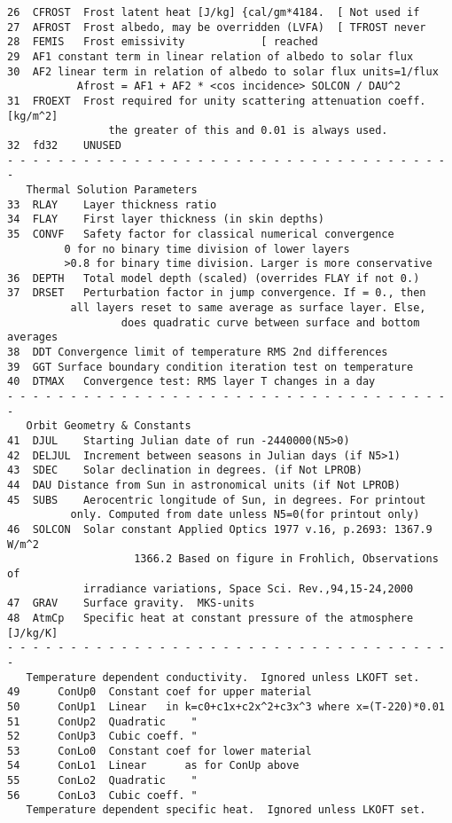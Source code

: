 \begin{verbatim}
26	CFROST	Frost latent heat [J/kg] {cal/gm*4184. 	[ Not used if
27	AFROST	Frost albedo, may be overridden (LVFA)	[ TFROST never
28	FEMIS	Frost emissivity  			[ reached
29	AF1	constant term in linear relation of albedo to solar flux
30	AF2	linear term in relation of albedo to solar flux units=1/flux
		   Afrost = AF1 + AF2 * <cos incidence> SOLCON / DAU^2
31	FROEXT	Frost required for unity scattering attenuation coeff. [kg/m^2]
                the greater of this and 0.01 is always used.
32	fd32    UNUSED
- - - - - - - - - - - - - - - - - - - - - - - - - - - - - - - - - - - - 
   Thermal Solution Parameters
33	RLAY	Layer thickness ratio
34	FLAY	First layer thickness (in skin depths)
35	CONVF	Safety factor for classical numerical convergence
		 0 for no binary time division of lower layers
		 >0.8 for binary time division. Larger is more conservative
36	DEPTH	Total model depth (scaled) (overrides FLAY if not 0.)
37	DRSET   Perturbation factor in jump convergence. If = 0., then
		  all layers reset to same average as surface layer. Else,
                  does quadratic curve between surface and bottom averages
38	DDT	Convergence limit of temperature RMS 2nd differences
39	GGT	Surface boundary condition iteration test on temperature
40	DTMAX	Convergence test: RMS layer T changes in a day
- - - - - - - - - - - - - - - - - - - - - - - - - - - - - - - - - - - - 
   Orbit Geometry & Constants
41	DJUL	Starting Julian date of run -2440000(N5>0)
42	DELJUL	Increment between seasons in Julian days (if N5>1)
43	SDEC	Solar declination in degrees. (if Not LPROB)
44	DAU	Distance from Sun in astronomical units (if Not LPROB)
45	SUBS	Aerocentric longitude of Sun, in degrees. For printout 
		  only. Computed from date unless N5=0(for printout only)
46	SOLCON	Solar constant Applied Optics 1977 v.16, p.2693: 1367.9 W/m^2
                    1366.2 Based on figure in Frohlich, Observations of 
		    irradiance variations, Space Sci. Rev.,94,15-24,2000
47	GRAV	Surface gravity.  MKS-units
48	AtmCp   Specific heat at constant pressure of the atmosphere [J/kg/K]
- - - - - - - - - - - - - - - - - - - - - - - - - - - - - - - - - - - - 
   Temperature dependent conductivity.  Ignored unless LKOFT set.
49      ConUp0  Constant coef for upper material 
50      ConUp1  Linear   in k=c0+c1x+c2x^2+c3x^3 where x=(T-220)*0.01
51      ConUp2  Quadratic    " 
52      ConUp3  Cubic coeff. "
53      ConLo0  Constant coef for lower material 
54      ConLo1  Linear      as for ConUp above
55      ConLo2  Quadratic    "
56      ConLo3  Cubic coeff. "
   Temperature dependent specific heat.  Ignored unless LKOFT set.

\end{verbatim}
